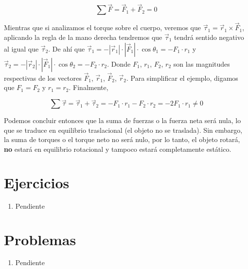 \documentclass[letterpaper]{article}
\begin{document}
$$\sum\vec{F} = \vec{F}_1 + \vec{F}_2 = 0$$

Mientras que si analizamos el torque sobre el cuerpo, veremos que $\vec{\tau}_1 = \vec{r}_1\times\vec{F}_1$, aplicando la regla de la mano derecha tendremos que $\vec{\tau}_1$ tendrá sentido negativo al igual que $\vec{\tau}_2$. De ahí que $\vec{\tau}_1 = -|\vec{r}_1|\cdot|\vec{F}_1|\cdot\cos{\theta_1} = -F_1\cdot r_1$ y $\vec{\tau}_2 = -|\vec{r}_2|\cdot|\vec{F}_1|\cdot\cos{\theta_2} = -F_2\cdot r_2$. Donde $F_1$, $r_1$, $F_2$, $r_2$ son las magnitudes respectivas de los vectores $\vec{F}_1$, $\vec{r}_1$, $\vec{F}_2$, $\vec{r}_2$. Para simplificar el ejemplo, digamos que $F_1 = 
F_2$ y $r_1 = r_2$. Finalmente,

$$\sum\vec{\tau} = \vec{\tau}_1 + \vec{\tau}_2 = -F_1\cdot r_1 - F_2\cdot r_2 = -2F_1\cdot r_1 \neq 0$$

Podemos concluir entonces que la suma de fuerzas o la fuerza neta será nula, lo que se traduce en equilibrio traslacional (el objeto no se traslada). Sin embargo, la suma de torques o el torque neto no será nulo, por lo tanto, el objeto rotará, \textbf{no} estará en equilibrio rotacional y tampoco estará completamente estático.

\begin{figure}[h]
\centering
{}
\end{figure}
 
\section*{Ejercicios}

\begin{enumerate}

\item Pendiente

\end{enumerate}

\section*{Problemas}

\begin{enumerate}

\item Pendiente

\end{enumerate}
\end{document}
